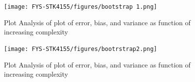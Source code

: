 \begin{figure}
    \centering
\texttt{[image: FYS-STK4155/figures/bootstrap 1.png]}
    \caption{Plot Analysis of  plot of error, bias, and variance as function of increasing complexity}
    \label{fig:2}
\end{figure}

\begin{figure}
    \centering
\texttt{[image: FYS-STK4155/figures/bootrstrap2.png]}
    \caption{Plot Analysis of  plot of error, bias, and variance as function of increasing complexity}
    \label{fig:3}
\end{figure}

